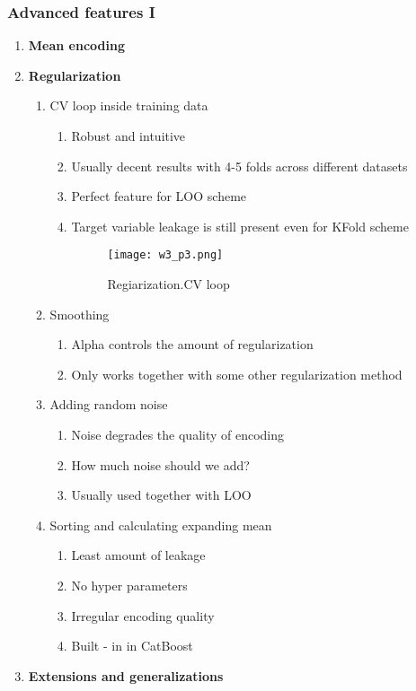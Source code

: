 \documentclass[11pt, twoside]{article}   	%
\begin{document}
 
\subsubsection{Advanced features I}
 \begin{enumerate}
\item \textbf{Mean encoding} 
\item \textbf{Regularization}
      \begin{enumerate}
      \item CV loop inside training data
       \begin{enumerate}
          \item Robust and intuitive
          \item Usually decent results with 4-5 folds across different datasets
          \item Perfect feature for LOO scheme
          \item Target variable leakage is still present even for KFold scheme
                    \begin{figure}
    [!htb]\centering
    \texttt{[image: w3\_p3.png]}
    \caption{Regiarization.CV loop}
  \label{fig:phase}
  \end{figure}
          \end{enumerate}
      \item Smoothing
       \begin{enumerate}
          \item Alpha controls the amount of regularization
          \item Only works together with some other regularization method
        \end{enumerate}          
      \item Adding random noise
       \begin{enumerate}
          \item Noise degrades the quality of encoding
          \item How much noise should we add?
          \item  Usually used together with LOO
        \end{enumerate}          
      \item Sorting and calculating expanding mean        
       \begin{enumerate}
          \item Least amount of leakage
          \item No hyper parameters
          \item Irregular encoding quality
          \item Built - in in CatBoost 
        \end{enumerate}   
     \end{enumerate}
\item \textbf{Extensions and generalizations}

 \end{enumerate}
\end{document}
